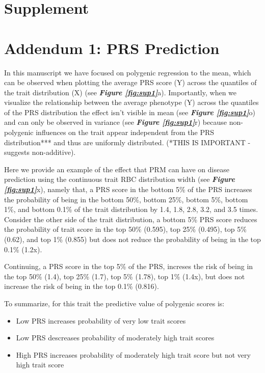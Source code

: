 \documentclass[times]{zHenriquesLab-StyleBioRxiv}
\newcommand\fref[1]{\normalsize{\textbf{\textit{Figure \ref{#1}}}}\normalsize{}}
\begin{document}
\clearpage \newpage

\clearpage \newpage



\section*{Supplement} \label{sec:supplement}



\section*{Addendum 1: PRS Prediction} \label{sec:supplement}

In this manuscript we have focused on polygenic regression to the mean, which can be observed when plotting 
the average PRS score (Y) across the quantiles of the trait distribution (X) (see \fref{fig:sup1}{a}).  
Importantly, when we visualize the relationship between the average phenotype (Y) across the quantiles 
of the PRS distribution the effect isn't visible in mean (see \fref{fig:sup1}{o}) and can only be observed 
in variance (see \fref{fig:sup1}{r}) because non-polygenic influences on the trait appear independent from 
the PRS distribution*** and thus are uniformly distributed. (*THIS IS IMPORTANT -suggests non-additive). 

Here we provide an example of the effect that PRM can have on disease prediction using the continuous trait 
RBC distribution width (see \fref{fig:sup1}{x}), namely that, a PRS score in the bottom 5\% of the PRS 
increases the probability of being in the bottom 50\%, bottom 25\%, bottom 5\%, bottom 1\%, and bottom 0.1\% 
of the trait distribution by 1.4, 1.8, 2.8, 3.2, and 3.5 times.  Consider the other side of the trait 
distribution, a bottom 5\% PRS score reduces the probability of trait score in the top 50\% (0.595), 
top 25\% (0.495), top 5\% (0.62), and top 1\% (0.855) but does not reduce the probability of being 
in the top 0.1\% (1.2x). 

Continuing, a PRS score in the top 5\% of the PRS, increses the risk of being in the 
top 50\% (1.4), top 25\% (1.7), top 5\% (1.78), top 1\% (1.4x), but does not increase the risk 
of being in the top 0.1\% (0.816). 


To summarize, for this trait the predictive value of polygenic scores is: 

\begin{itemize} 
\item Low PRS increases probability of very low trait scores 
\item Low PRS descreases probability of moderately high trait scores 
\item High PRS increases probability of moderately high trait score but not very high trait score
\end{itemize} 
\end{document}
